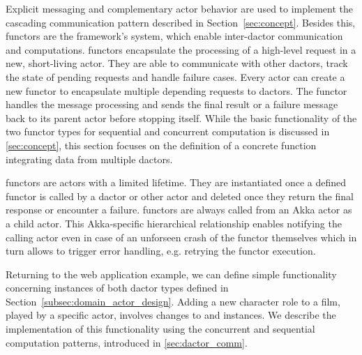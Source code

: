     Explicit messaging and complementary actor behavior are used to implement the cascading communication pattern described in Section~\ref{sec:concept}.
    Besides this, \glspl{functor} are the framework's system, which enable inter-\gls{dactor} communication and computations.
    \Glspl{functor} encapsulate the processing of a high-level request in a new, short-living actor.
    They are able to communicate with other \glspl{dactor}, track the state of pending requests and handle failure cases.
    Every actor can create a new \gls{functor} to encapsulate multiple depending requests to \glspl{dactor}.
    The \gls{functor} handles the message processing and sends the final result or a failure message back to its parent actor before stopping itself.
    While the basic functionality of the two \gls{functor} types for sequential and concurrent computation is discussed in \cref{sec:concept}, this section focuses on the definition of a concrete function integrating data from multiple \glspl{dactor}.
    
    \Glspl{functor} are actors with a limited lifetime.
    They are instantiated once a defined \gls{functor} is called by a \gls{dactor} or other actor and deleted once they return the final response or encounter a failure.
    \Glspl{functor} are always called from an Akka actor as a child actor.
    This Akka-specific hierarchical relationship enables notifying the calling actor even in case of an unforseen crash of the \gls{functor} themselves which in turn allows to trigger error handling, e.g. retrying the \gls{functor} execution.
    
    Returning to the web application example, we can define simple functionality concerning instances of both \gls{dactor} types defined in Section~\ref{subsec:domain_actor_design}.
    Adding a new character role to a film, played by a specific actor, involves changes to  and  instances.
    We describe the implementation of this functionality using the concurrent and sequential computation patterns, introduced in \cref{sec:dactor_comm}.
    
